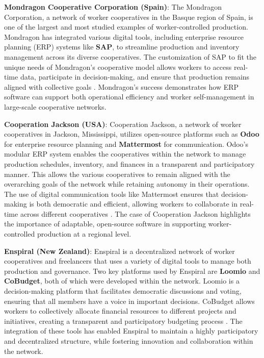 \begin{refsection}
\textbf{Mondragon Cooperative Corporation (Spain)}: The Mondragon Corporation, a network of worker cooperatives in the Basque region of Spain, is one of the largest and most studied examples of worker-controlled production. Mondragon has integrated various digital tools, including enterprise resource planning (ERP) systems like \textbf{SAP}, to streamline production and inventory management across its diverse cooperatives. The customization of SAP to fit the unique needs of Mondragon's cooperative model allows workers to access real-time data, participate in decision-making, and ensure that production remains aligned with collective goals \cite[pp.~135-139]{kasmir1996}. Mondragon’s success demonstrates how ERP software can support both operational efficiency and worker self-management in large-scale cooperative networks.

\textbf{Cooperation Jackson (USA)}: Cooperation Jackson, a network of worker cooperatives in Jackson, Mississippi, utilizes open-source platforms such as \textbf{Odoo} for enterprise resource planning and \textbf{Mattermost} for communication. Odoo’s modular ERP system enables the cooperatives within the network to manage production schedules, inventory, and finances in a transparent and participatory manner. This allows the various cooperatives to remain aligned with the overarching goals of the network while retaining autonomy in their operations. The use of digital communication tools like Mattermost ensures that decision-making is both democratic and efficient, allowing workers to collaborate in real-time across different cooperatives \cite[pp.~58-62]{akuno2017}. The case of Cooperation Jackson highlights the importance of adaptable, open-source software in supporting worker-controlled production at a regional level.

\textbf{Enspiral (New Zealand)}: Enspiral is a decentralized network of worker cooperatives and freelancers that uses a variety of digital tools to manage both production and governance. Two key platforms used by Enspiral are \textbf{Loomio} and \textbf{CoBudget}, both of which were developed within the network. Loomio is a decision-making platform that facilitates democratic discussions and voting, ensuring that all members have a voice in important decisions. CoBudget allows workers to collectively allocate financial resources to different projects and initiatives, creating a transparent and participatory budgeting process \cite[pp.~91-95]{restakis2012}. The integration of these tools has enabled Enspiral to maintain a highly participatory and decentralized structure, while fostering innovation and collaboration within the network.


\end{refsection}
